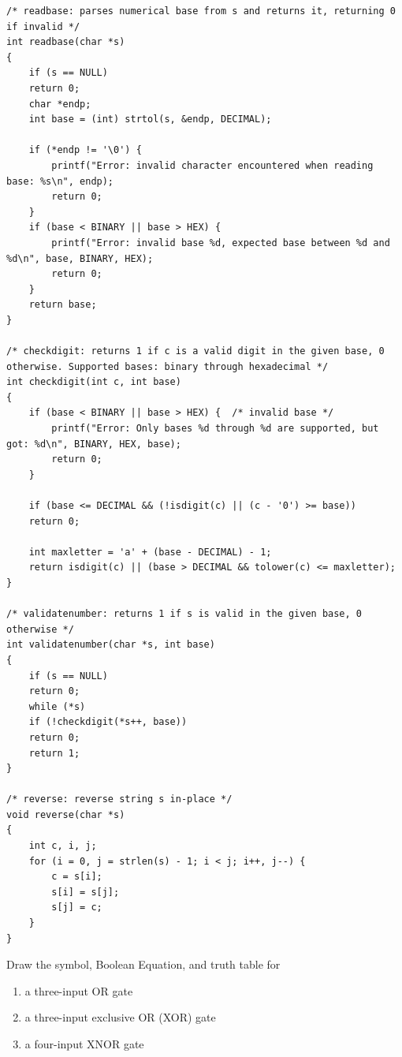 \documentclass[12pt]{article}
\newenvironment{ex}[2][Exercise]{\begin{trivlist}
		\item[\hskip \labelsep {\bfseries #1}\hskip \labelsep {\bfseries #2.}]}{\end{trivlist}}
\newenvironment{sol}[1][Solution]{\begin{trivlist}
		\item[\hskip \labelsep {\bfseries #1:}]}{\end{trivlist}}
\begin{document}
\begin{sol}
\begin{lstlisting}
/* readbase: parses numerical base from s and returns it, returning 0 if invalid */
int readbase(char *s)
{
	if (s == NULL)
	return 0;
	char *endp;
	int base = (int) strtol(s, &endp, DECIMAL);
	
	if (*endp != '\0') {
		printf("Error: invalid character encountered when reading base: %s\n", endp);
		return 0;
	}
	if (base < BINARY || base > HEX) {
		printf("Error: invalid base %d, expected base between %d and %d\n", base, BINARY, HEX);
		return 0;
	}
	return base;
}

/* checkdigit: returns 1 if c is a valid digit in the given base, 0 otherwise. Supported bases: binary through hexadecimal */
int checkdigit(int c, int base)
{
	if (base < BINARY || base > HEX) {	/* invalid base */
		printf("Error: Only bases %d through %d are supported, but got: %d\n", BINARY, HEX, base);
		return 0;
	}
	
	if (base <= DECIMAL && (!isdigit(c) || (c - '0') >= base))
	return 0;
	
	int maxletter = 'a' + (base - DECIMAL) - 1;
	return isdigit(c) || (base > DECIMAL && tolower(c) <= maxletter); 
}

/* validatenumber: returns 1 if s is valid in the given base, 0 otherwise */
int validatenumber(char *s, int base)
{
	if (s == NULL)
	return 0;
	while (*s)
	if (!checkdigit(*s++, base))
	return 0;
	return 1;    
}

/* reverse: reverse string s in-place */
void reverse(char *s)
{
	int c, i, j;
	for (i = 0, j = strlen(s) - 1; i < j; i++, j--) {
		c = s[i];
		s[i] = s[j];
		s[j] = c;
	}
}

	\end{lstlisting}
\end{sol}

\begin{ex}{1.71}
	Draw the symbol, Boolean Equation, and truth table for
	\begin{enumerate}[label=(\alph*)]
		\item a three-input OR gate
		\item a three-input exclusive OR (XOR) gate
		\item a four-input XNOR gate
	\end{enumerate}
\end{ex}
\end{document}
